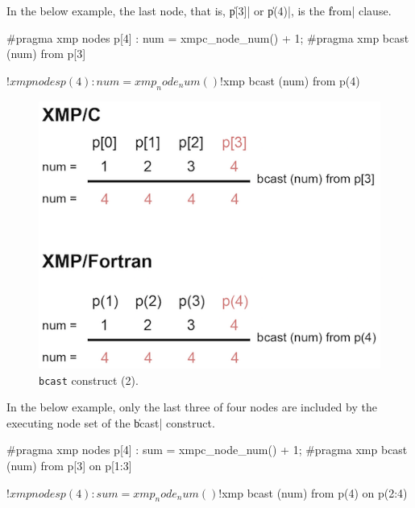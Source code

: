 In the below example, the last node, that is, \|p[3]| or \|p(4)|, is the \|from| clause.

\begin{XCexample}
#pragma xmp nodes p[4]
  :
num = xmpc_node_num() + 1;
#pragma xmp bcast (num) from p[3]
\end{XCexample}

\begin{XFexample}
!$xmp nodes p(4)
  :
num = xmp_node_num()
!$xmp bcast (num) from p(4)
\end{XFexample}

\begin{figure}
  \centering
  \includegraphics{figs/bcast_from.png}
  \caption{{\tt bcast} construct (2).}
\end{figure}

In the below example, only the last three of four nodes
are included by the executing node set of the \|bcast| construct.

\begin{XCexample}
#pragma xmp nodes p[4]
  :
sum = xmpc_node_num() + 1;
#pragma xmp bcast (num) from p[3] on p[1:3]
\end{XCexample}

\begin{XFexample}
!$xmp nodes p(4)
  :
 sum = xmp_node_num()
 !$xmp bcast (num) from p(4) on p(2:4)
\end{XFexample}

